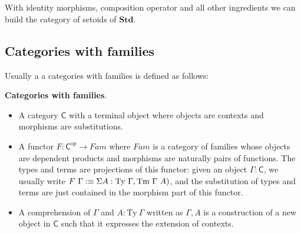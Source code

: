 \begin{code}
\\
\>  \AgdaSymbol{(}  \AgdaSymbol{:} \AgdaSymbol{)} \AgdaSymbol{:}  \<%
\\
\>[0]\<[2]%
\>[2]\<%
\\
\>[2]\<[4]%
\>[4] \<[9]%
\>[9]\AgdaSymbol{:}       \<%
\\
\>[2]\<[4]%
\>[4] \AgdaSymbol{:} \AgdaSymbol{\{}  \AgdaSymbol{:}   \AgdaSymbol{\}}  \<[27]%
\>[27]\<%
\\
\>[4]\<[11]%
\>[11]\AgdaFunction{[}  \AgdaFunction{]}     \<[25]%
\>[25]\<%
\\
\>[4]\<[11]%
\>[11]\AgdaFunction{[}  \AgdaFunction{]}     \<%
\\
\end{code}


With identity morphisms, composition operator and all other ingredients we can build the category of setoids of $\textbf{Std}$.


\subsection{Categories with families}

Usually a a categories with families is defined as follows:

\begin{definition}\label{cwf:def}
\textbf{Categories with families}.

\begin{itemize}
\item A category $\mathsf{C}$ with a terminal object where objects are contexts and morphisms are substitutions.

\item A functor $F : \mathsf{C}^{op} \to Fam$ where $Fam$ is a category of families whose objects are dependent products and morphisms are naturally pairs of functions. The types and terms are projections of this functor: given an object $\Gamma : \mathsf{C}$, we usually write $F ~ \Gamma \vcentcolon\equiv \Sigma A : \text{Ty} ~\Gamma, \text{Tm} ~\Gamma ~ A)$, and the substitution of types and terms are just contained in the morphism part of this functor. 

\item A comprehension of $\Gamma$ and $A : \text{Ty}~ \Gamma$ written as $\Gamma, A$ is a construction of a new object in $\mathsf{C}$ such that it expresses the extension of contexts.
\end{itemize}

\end{definition}

